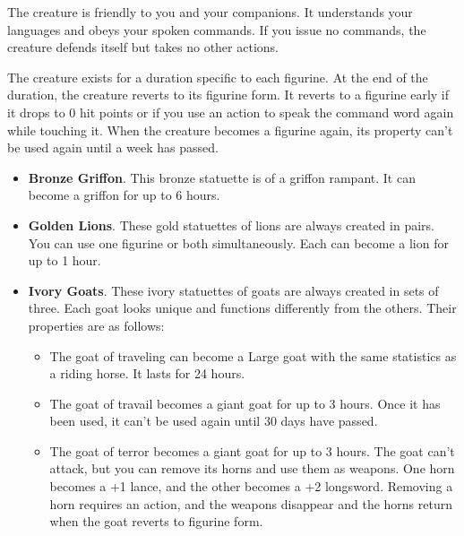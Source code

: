         The creature is friendly to you and your companions.
        It understands your languages and obeys your spoken commands.
        If you issue no commands, the creature defends itself but takes no other actions.

        The creature exists for a duration specific to each figurine.
        At the end of the duration, the creature reverts to its figurine form.
        It reverts to a figurine early if it drops to 0 hit points or if you use an action to speak the command word again while touching it.
        When the creature becomes a figurine again, its property can't be used again until a week has passed.

        \begin{itemize}
            \item \textbf{Bronze Griffon}.
            This bronze statuette is of a griffon rampant.
            It can become a griffon for up to 6 hours.
            \item \textbf{Golden Lions}.
            These gold statuettes of lions are always created in pairs.
            You can use one figurine or both simultaneously.
            Each can become a lion for up to 1 hour.
            \item \textbf{Ivory Goats}.
            These ivory statuettes of goats are always created in sets of three.
            Each goat looks unique and functions differently from the others.
            Their properties are as follows:
            \begin{itemize}
                \item The goat of traveling can become a Large goat with the same statistics as a riding horse.
                It lasts for 24 hours.
                \item The goat of travail becomes a giant goat for up to 3 hours.
                Once it has been used, it can't be used again until 30 days have passed.
                \item The goat of terror becomes a giant goat for up to 3 hours.
                The goat can't attack, but you can remove its horns and use them as weapons.
                One horn becomes a +1 lance, and the other becomes a +2 longsword.
                Removing a horn requires an action, and the weapons disappear and the horns return when the goat reverts to figurine form.


\end{itemize}
\end{itemize}
